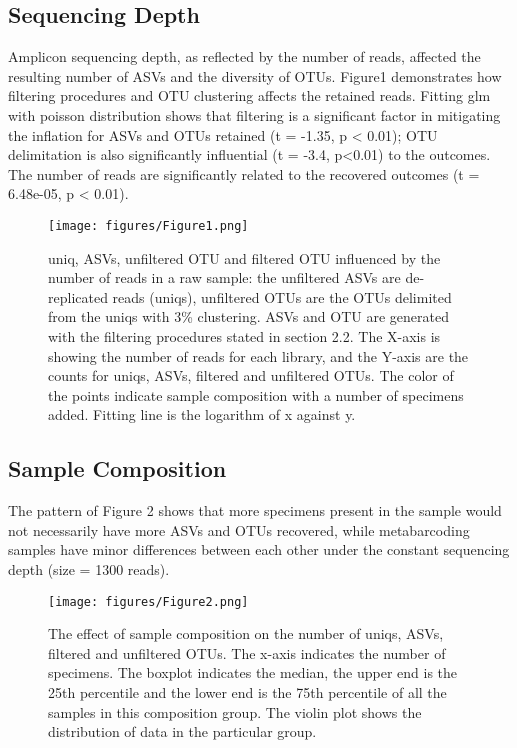\documentclass[11pt, a4paper]{article}
\begin{document}
\subsection{Sequencing Depth}
Amplicon sequencing depth, as reflected by the number of reads,  affected the resulting number of ASVs and the diversity of OTUs. Figure1 demonstrates how filtering procedures and OTU clustering affects the retained reads. Fitting glm with poisson distribution shows that filtering is a significant factor in mitigating the inflation for ASVs and OTUs retained (t = -1.35, p < 0.01); OTU delimitation is also significantly influential (t = -3.4, p<0.01) to the outcomes. The number of reads are significantly related to the recovered outcomes (t = 6.48e-05, p < 0.01). 
\begin{figure}
    \centering
    \texttt{[image: figures/Figure1.png]}
    \caption{uniq, ASVs, unfiltered OTU and filtered OTU influenced by the number of reads in a raw sample: the unfiltered ASVs are de-replicated reads (uniqs), unfiltered OTUs are the OTUs delimited from the uniqs with 3\% clustering. ASVs and OTU are generated with the filtering procedures stated in section 2.2. The X-axis is showing the number of reads for each library, and the Y-axis are the counts for uniqs, ASVs, filtered and unfiltered OTUs. The color of the points indicate sample composition with a number of specimens added. Fitting line is the logarithm of x against y.}
    \label{fig1}
\end{figure}

\subsection{Sample Composition}
The pattern of Figure 2 shows that more specimens present in the sample would not necessarily have more ASVs and OTUs recovered, while metabarcoding samples have minor differences between each other under the constant sequencing depth (size = 1300 reads).

\begin{figure}
    \centering
    \texttt{[image: figures/Figure2.png]}
    \caption{The effect of sample composition on the number of uniqs, ASVs, filtered and unfiltered OTUs. The x-axis indicates the number of specimens. The boxplot indicates the median, the upper end is the 25th percentile and the lower end is the 75th percentile of all the samples in this composition group. The violin plot shows the distribution of data in the particular group.}
    \label{fig2}
\end{figure}
\end{document}

